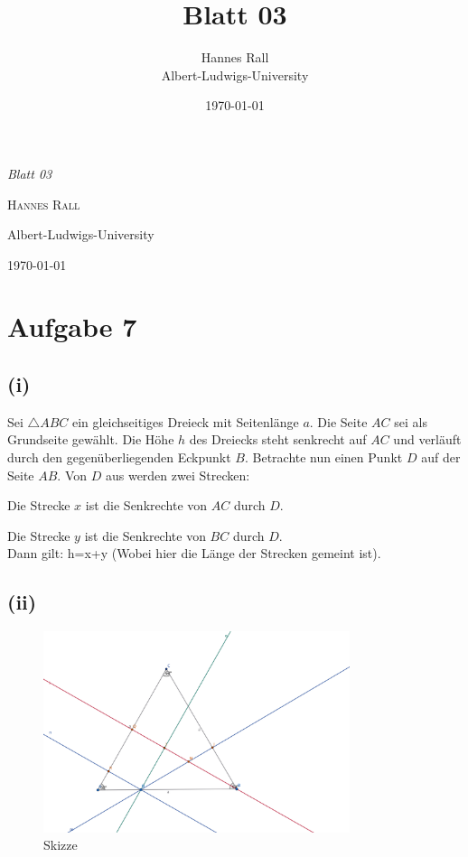 \documentclass[12pt,a4paper]{article}
\title{Blatt 03}
\author{Hannes Rall \\ Albert-Ludwigs-University}
\date{\today}
\begin{document}
 
\begin{titlepage}     
    \centering     
    \vspace*{2cm}     
    {\Huge\itshape Blatt 03\par}     
    \vspace{2cm}     
    {\Large\textsc{Hannes Rall}\par}     
    \vfill     
    {\large Albert-Ludwigs-University\\}     
    \vspace{1cm}     
    {\large\today\par}
\end{titlepage}

\newpage
\section*{Aufgabe 7}
\subsection*{(i)}
Sei $\triangle ABC$ ein gleichseitiges Dreieck mit Seitenlänge $a$. Die Seite $AC$ sei als Grundseite gewählt. Die Höhe $h$ des Dreiecks steht senkrecht auf $AC$ und verläuft durch den gegenüberliegenden Eckpunkt $B$. Betrachte nun einen Punkt $D$ auf der Seite $AB$. Von $D$ aus werden zwei Strecken:

Die Strecke $x$ ist die Senkrechte von $AC$ durch $D$.

Die Strecke $y$ ist die Senkrechte von $BC$ durch $D$.\\
Dann gilt: h=x+y (Wobei hier die Länge der Strecken gemeint ist).
\subsection*{(ii)}
\begin{figure}[htbp]        
    \centering        
    \includegraphics[width=0.8\textwidth]{Blatt03_Aufgabe_7_ii.png}
    \caption{Skizze}
    \label{fig:mein_bild}
\end{figure}
\end{document}
